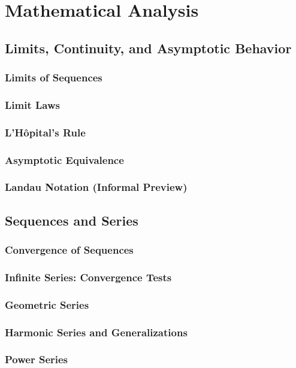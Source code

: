 \section{Mathematical Analysis}
\subsection{Limits, Continuity, and Asymptotic Behavior}
\subsubsection{Limits of Sequences}
\subsubsection{Limit Laws}
\subsubsection{L'Hôpital's Rule}
\subsubsection{Asymptotic Equivalence}
\subsubsection{Landau Notation (Informal Preview)}

\subsection{Sequences and Series}
\subsubsection{Convergence of Sequences}
\subsubsection{Infinite Series: Convergence Tests}
\subsubsection{Geometric Series}
\subsubsection{Harmonic Series and Generalizations}
\subsubsection{Power Series}

